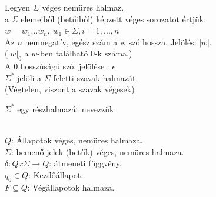 \begin{frame}
\begin{tcolorbox}[title={Def.: $\Sigma$ feletti szó}]
Legyen $\Sigma$ véges nemüres halmaz.\\
\mmedskip
{} a $\Sigma$ elemeiből (betűiből) képzett véges sorozatot értjük: \\
\mmedskip
$w = w_1 ... w_n$, $w_1 \in {\Sigma}, i = 1, ..., n$\\
\mmedskip
{} Az $n$ nemnegatív, egész szám a w szó hossza. Jelölés: $|w|$.\\
($|w|_0$ a $w$-ben található $0$-k száma.)\\
\mmedskip
{} A $0$ hosszúságú szó, jelölése : $\epsilon$\\
\mmedskip
${\Sigma}^*$ jelöli a $\Sigma$ feletti szavak halmazát.\\
(Végtelen, viszont a szavak végesek)
\end{tcolorbox}

\begin{tcolorbox}[title={Def.: $\Sigma$ feletti nyelv}]
${\Sigma}^*$ egy részhalmazát  nevezzük.
\end{tcolorbox}

\begin{tcolorbox}[title={Def.: Véges automata}]
\\
\mmedskip
$Q$: Állapotok véges, nemüres halmaza.\\
\mmedskip
$\Sigma$: bemenő jelek (betűk) véges, nemüres halmaza.\\
\mmedskip
$\delta : Q x \Sigma \rightarrow Q$: átmeneti függvény.\\
\mmedskip
$q_0 \in Q$: Kezdőállapot.\\
\mmedskip
$F \subseteq Q$: Végállapotok halmaza.\\
\end{tcolorbox}

\end{frame}


